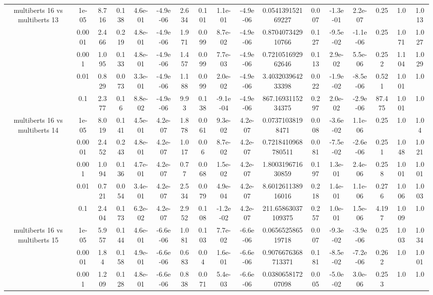 \begin{tabular}{|c|c|c|c|c|c|c|c|c|c|c|c|c|c|c|c|c|}
\hline
\multirow{5}{*}{multiberts 16 vs multiberts 13} & 1e-05 & 8.716 & 0.138 & 4.6e-01 & -4.9e-06 & 2.634 & 0.101 & 1.1e-01 & -4.9e-06 & 0.054139152169227 & 0.007 & -1.3e-01 & 2.2e-07 & 0.25 & 1.0 & 1.013 \\
 & 0.0001 & 2.466 & 0.219 & 4.8e-01 & -4.9e-06 & 1.971 & 0.099 & 8.7e-02 & -4.9e-06 & 0.870407342910766 & 0.127 & -9.5e-02 & -1.1e-06 & 0.25 & 1.071 & 1.027 \\
 & 0.001 & 1.095 & 0.133 & 4.8e-01 & -4.9e-06 & 1.457 & 0.099 & 7.7e-03 & -4.9e-06 & 0.721051692962646 & 0.113 & 2.9e-02 & 5.5e-06 & 0.252 & 1.104 & 1.029 \\
 & 0.01 & 0.829 & 0.073 & 3.3e-01 & -4.9e-06 & 1.188 & 0.099 & 2.0e-02 & -4.9e-06 & 3.403203964233398 & 0.022 & -1.9e-02 & -8.5e-06 & 0.521 & 1.001 & 1.0 \\
 & 0.1 & 2.377 & 0.16 & 8.8e-02 & -4.9e-06 & 9.93 & 0.138 & -9.1e-04 & -4.9e-06 & 867.1693115234375 & 0.297 & 2.0e-02 & -2.9e-06 & 87.475 & 1.001 & 1.0 \\
\hline
\multirow{5}{*}{multiberts 16 vs multiberts 14} & 1e-05 & 8.019 & 0.141 & 4.5e-01 & 4.2e-07 & 1.878 & 0.061 & 9.3e-02 & 4.2e-07 & 0.07371038198471 & 0.008 & -3.6e-02 & 1.1e-06 & 0.25 & 1.0 & 1.04 \\
 & 0.0001 & 2.452 & 0.243 & 4.8e-01 & 4.2e-07 & 1.017 & 0.06 & 8.7e-02 & 4.2e-07 & 0.7218410968780511 & 0.081 & -7.5e-02 & -2.6e-06 & 0.251 & 1.048 & 1.021 \\
 & 0.001 & 1.094 & 0.136 & 4.7e-01 & 4.2e-07 & 0.77 & 0.068 & 1.5e-02 & 4.2e-07 & 1.800319671630859 & 0.197 & 1.3e-01 & 2.4e-06 & 0.258 & 1.001 & 1.001 \\
 & 0.01 & 0.721 & 0.054 & 3.4e-01 & 4.2e-07 & 2.534 & 0.079 & 4.9e-04 & 4.2e-07 & 8.601261138916016 & 0.218 & 1.4e-01 & 1.1e-06 & 0.276 & 1.006 & 1.003 \\
 & 0.1 & 2.404 & 0.173 & 6.2e-02 & 4.2e-07 & 2.952 & 0.108 & -1.2e-02 & 4.2e-07 & 211.65863037109375 & 0.257 & 1.0e-01 & 1.5e-06 & 4.197 & 1.009 & 1.0 \\
\hline
\multirow{5}{*}{multiberts 16 vs multiberts 15} & 1e-05 & 5.957 & 0.144 & 4.6e-01 & -6.6e-06 & 1.081 & 0.103 & 7.7e-02 & -6.6e-06 & 0.065652586519718 & 0.007 & -9.3e-02 & -3.9e-06 & 0.25 & 1.003 & 1.034 \\
 & 0.0001 & 1.84 & 0.158 & 4.9e-01 & -6.6e-06 & 0.683 & 0.04 & 1.6e-01 & -6.6e-06 & 0.9076676368713371 & 0.181 & -8.5e-02 & -7.2e-06 & 0.262 & 1.0 & 1.001 \\
 & 0.001 & 1.209 & 0.128 & 4.8e-01 & -6.6e-06 & 0.838 & 0.071 & 5.4e-03 & -6.6e-06 & 0.038065817207098 & 0.005 & -5.0e-02 & 3.0e-06 & 0.253 & 1.0 & 1.0 \\

\end{tabular}
